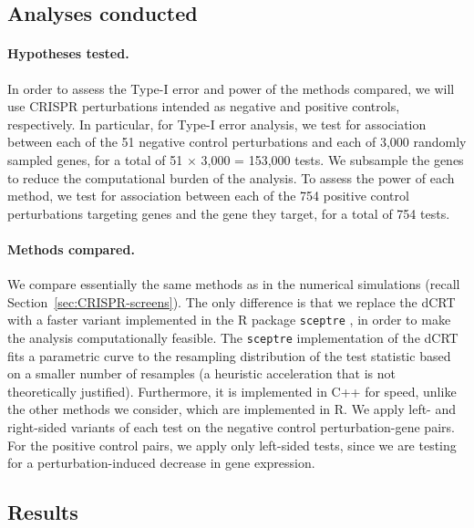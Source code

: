 \documentclass[12pt]{article}
\theoremstyle{definition}
\begin{document}
\subsection{Analyses conducted}

\paragraph{Hypotheses tested.} In order to assess the Type-I error and power of the methods compared, we will use CRISPR perturbations intended as negative and positive controls, respectively. In particular, for Type-I error analysis, we test for association between each of the 51 negative control perturbations and each of 3,000 randomly sampled genes, for a total of 51 $\times$ 3,000 = 153,000 tests. We subsample the genes to reduce the computational burden of the analysis. To assess the power of each method, we test for association between each of the 754 positive control perturbations targeting genes and the gene they target, for a total of 754 tests. 

\paragraph{Methods compared.} We compare essentially the same methods as in the numerical simulations (recall Section~\ref{sec:CRISPR-screens}). The only difference is that we replace the dCRT with a faster variant implemented in the R package \verb|sceptre| \citep{Barry2024,Katsevich2020c}, in order to make the analysis computationally feasible. The \verb|sceptre| implementation of the dCRT fits a parametric curve to the resampling distribution of the test statistic based on a smaller number of resamples (a heuristic acceleration that is not theoretically justified). Furthermore, it is implemented in C++ for speed, unlike the other methods we consider, which are implemented in R. We apply left- and right-sided variants of each test on the negative control perturbation-gene pairs. For the positive control pairs, we apply only left-sided tests, since we are testing for a perturbation-induced decrease in gene expression.

\subsection{Results}
\end{document}
